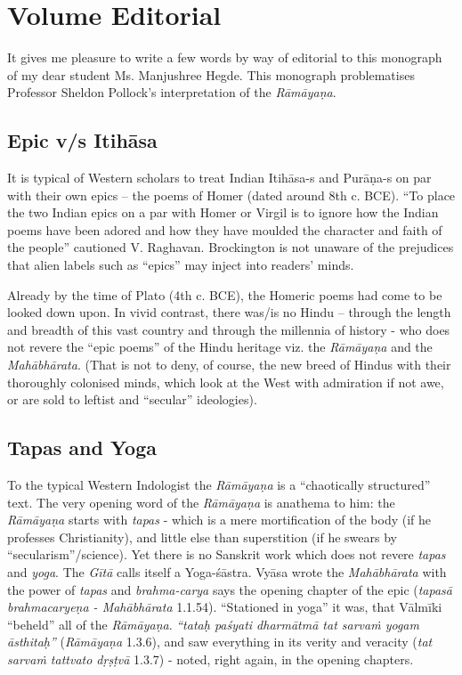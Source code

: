 \chapter*{Volume Editorial}\label{volume_editorial}



It gives me pleasure to write a few words by way of editorial to this monograph of my dear student Ms. Manjushree Hegde. This monograph problematises Professor Sheldon Pollock's interpretation of the {\sl Rāmāyaṇa}.

\section*{Epic v/s Itihāsa}

It is typical of Western scholars to treat Indian Itihāsa-s and Purāṇa-s on par with their own epics -- the poems of Homer (dated around 8th c. BCE). ``To place the two Indian epics on a par with Homer or Virgil is to ignore how the Indian poems have been adored and how they have moulded the character and faith of the people'' cautioned V. Raghavan. Brockington is not unaware of the prejudices that alien labels such as ``epics'' may inject into readers' minds. 
 
Already by the time of Plato (4th c. BCE), the Homeric poems had come to be looked down upon. In vivid contrast, there was/is no Hindu -- through  the length and breadth of this vast country and through the millennia of history - who does not revere the ``epic poems'' of the Hindu heritage viz. the {\sl Rāmāyaṇa} and the {\sl Mahābhārata}. (That is not to deny, of course, the new breed of Hindus with their thoroughly colonised minds, which look at the West with admiration if not awe, or are sold to leftist and ``secular'' ideologies).

\section*{Tapas and Yoga}

To the typical Western Indologist the {\sl Rāmāyaṇa} is a ``chaotically structured'' text. The very opening word of the {\sl Rāmāyaṇa} is anathema to him: the {\sl Rāmāyaṇa} starts with {\sl tapas} -  which is a mere mortification of the body (if he professes Christianity), and little else than superstition (if he swears by ``secularism''/science). Yet there is no Sanskrit work which does not revere {\sl tapas} and {\sl yoga}. The {\sl Gītā} calls itself a Yoga-śāstra. Vyāsa wrote the {\sl Mahābhārata} with the power of {\sl tapas} and {\sl brahma-carya} says the opening chapter of the epic ({\sl tapasā brahmacaryeṇa  - Mahābhārata} 1.1.54). ``Stationed in yoga'' it was, that Vālmīki  ``beheld'' all of the {\sl Rāmāyaṇa}. {\sl ``tataḥ paśyati dharmātmā tat sarvaṁ yogam āsthitaḥ''} ({\sl Rāmāyaṇa} 1.3.6), and saw everything in its verity and veracity ({\sl tat sarvaṁ tattvato dṛṣṭvā} 1.3.7) - noted, right again, in the opening chapters.

